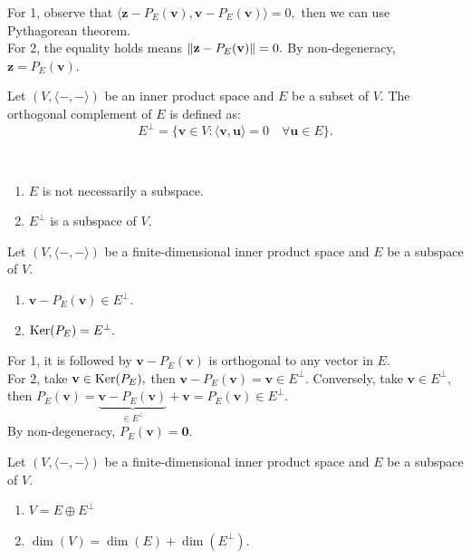 \documentclass[12pt]{article}
\begin{document}
\begin{pfbox}
    For 1, observe that $\langle \mathbf{z}-P_E(\mathbf{v}), \mathbf{v}-P_E(\mathbf{v})\rangle=0,$ then we can use Pythagorean theorem.\\
    For 2, the equality holds means $\left\lVert \mathbf{z}-P_E(\mathbf{v}) \right\rVert=0.$ By non-degeneracy, $\mathbf{z}=P_E(\mathbf{v}).$
\end{pfbox}

\begin{definition}
    Let $(V,\langle-,-\rangle)$ be an inner product space and $E$ be a subset of $V$.
    The orthogonal complement of $E$ is defined as:
    \[E^\perp=\{\mathbf{v}\in V: \langle \mathbf{v},\mathbf{u}\rangle=0\quad\forall \mathbf{u}\in E\}.\]
\end{definition}

\begin{remark}\
    \begin{enumerate}
        \item $E$ is not necessarily a subspace.
        \item $E^\perp$ is a subspace of $V$.
    \end{enumerate}
\end{remark}

\begin{theorem}
 Let $(V,\langle-,-\rangle)$ be a finite-dimensional inner product space and $E$ be a subspace of $V$.
 \begin{enumerate}
    \item $\mathbf{v}-P_E(\mathbf{v})\in E^\perp.$
    \item $\operatorname{Ker}(P_E)=E^\perp.$
\end{enumerate}
\end{theorem}

\begin{pfbox}
    For 1, it is followed by $\mathbf{v}-P_E(\mathbf{v})$ is orthogonal to any vector in $E$.\\
    For 2, take $\mathbf{v}\in \operatorname{Ker}(P_E),$ then $\mathbf{v}-P_E(\mathbf{v})=\mathbf{v}\in E^\perp.$
    Conversely, take $\mathbf{v}\in E^\perp,$ then $P_E(\mathbf{v})=\underbrace{\mathbf{v}-P_E(\mathbf{v})}_{\in E^\perp}+\mathbf{v}=P_E(\mathbf{v})\in E^\perp.$\\
    By non-degeneracy, $P_E(\mathbf{v})=\mathbf{0}.$
\end{pfbox}

\begin{theorem}
 Let $(V,\langle-,-\rangle)$ be a finite-dimensional inner product space and $E$ be a subspace of $V$.
 \begin{enumerate}
    \item $V=E\oplus E^\perp$
    \item $\dim(V)=\dim(E)+\dim(E^\perp).$
\end{enumerate}
\end{theorem}
\end{document}
